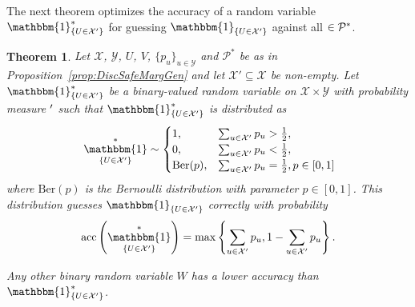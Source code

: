 \documentclass[a4paper]{report}
\theoremstyle{plain}
\newtheorem{theorem}{Theorem}[section]
\theoremstyle{definition}
\theoremstyle{remark}
\numberwithin{equation}{chapter}
\let\P\relax
\DeclareMathOperator{\P}{\mathbb{P}}
\DeclareMathOperator{\1}{\mathbbm{1}}
\newcommand{\X}{\mathcal{X}}
\newcommand{\Y}{\mathcal{Y}}
\DeclareMathOperator{\acc}{acc}
\newcommand{\Pmod}{\mathcal{P}^*}
\newcommand{\GeneralGenInd}{\1_{\{U\in\X'\}}}
\begin{document}
The next theorem optimizes the accuracy of a random variable $\GeneralGenInd^*$ for guessing $\GeneralGenInd$ against all $\P\in\Pmod$.
\begin{theorem}\label{thm:DiscAccOpt}
Let $\X$, $\Y$, $U$, $V$, $\{p_u\}_{u\in\Y}$ and $\Pmod$ be as in Proposition~\ref{prop:DiscSafeMargGen} and let $\X'\subseteq\X$ be non-empty. Let $\GeneralGenInd^*$ be a binary-valued random variable on $\X\times\Y$ with probability measure $\P'$ such that $\GeneralGenInd^*$ is distributed as
\begin{equation}\
\GeneralGenInd^*\sim\begin{cases}
1,&\sum_{u\in\X'}p_u>\frac{1}{2},\\
0,&\sum_{u\in\X'}p_u<\frac{1}{2},\\
\mathrm{Ber}(p),&\sum_{u\in\X'}p_u=\frac{1}{2},p\in[0,1]
\end{cases}
\end{equation}
where $\mathrm{Ber}(p)$ is the Bernoulli distribution with parameter $p\in[0,1]$. This distribution guesses $\GeneralGenInd$ correctly with probability
\begin{equation}
\acc^{\P}\left(\GeneralGenInd^*\right)=\max\left\{\sum_{u\in\X'}p_u,1-\sum_{u\in\X'}p_u\right\}.
\end{equation}

Any other binary random variable $W$ has a lower accuracy than $\GeneralGenInd^*$.
\end{theorem}
\end{document}
